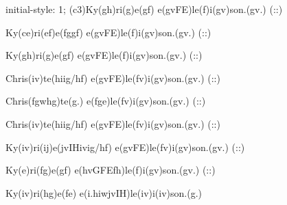 initial-style: 1;
(c3)Ky(gh)ri(g)e(gf) e(gvFE)le(f)i(gv)son.(gv.) (::)

Ky(ce)ri(ef)e(fggf) e(gvFE)le(f)i(gv)son.(gv.) (::)

Ky(gh)ri(g)e(gf) e(gvFE)le(f)i(gv)son.(gv.) (::)

Chris(iv)te(hiig/hf) e(gvFE)le(fv)i(gv)son.(gv.) (::)

Chris(fgwhg)te(g.) e(fge)le(fv)i(gv)son.(gv.) (::)

Chris(iv)te(hiig/hf) e(gvFE)le(fv)i(gv)son.(gv.) (::)

Ky(iv)ri(ij)e(jvIHivig/hf) e(gvFE)le(fv)i(gv)son.(gv.) (::)

Ky(e)ri(fg)e(gf) e(hvGFEfh)le(f)i(gv)son.(gv.) (::)

Ky(iv)ri(hg)e(fe) e(i.hiwjvIH)le(iv)i(iv)son.(g.)
